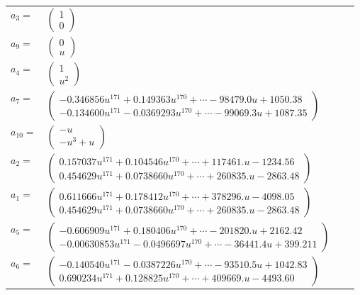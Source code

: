 \documentclass[1p]{elsarticle_modified}
\theoremstyle{definition}
\begin{document}
\begin{tabular}{m{7pt} m{180pt} m{7pt} m{180pt} }
\flushright $a_{3}=$&$\begin{pmatrix}1\\0\end{pmatrix}$ \\
\flushright $a_{9}=$&$\begin{pmatrix}0\\u\end{pmatrix}$ \\
\flushright $a_{4}=$&$\begin{pmatrix}1\\u^2\end{pmatrix}$ \\
\flushright $a_{7}=$&$\begin{pmatrix}-0.346856 u^{171}+0.149363 u^{170}+\cdots-98479.0 u+1050.38\\-0.134600 u^{171}-0.0369293 u^{170}+\cdots-99069.3 u+1087.35\end{pmatrix}$ \\
\flushright $a_{10}=$&$\begin{pmatrix}- u\\- u^3+u\end{pmatrix}$ \\
\flushright $a_{2}=$&$\begin{pmatrix}0.157037 u^{171}+0.104546 u^{170}+\cdots+117461. u-1234.56\\0.454629 u^{171}+0.0738660 u^{170}+\cdots+260835. u-2863.48\end{pmatrix}$ \\
\flushright $a_{1}=$&$\begin{pmatrix}0.611666 u^{171}+0.178412 u^{170}+\cdots+378296. u-4098.05\\0.454629 u^{171}+0.0738660 u^{170}+\cdots+260835. u-2863.48\end{pmatrix}$ \\
\flushright $a_{5}=$&$\begin{pmatrix}-0.606909 u^{171}+0.180406 u^{170}+\cdots-201820. u+2162.42\\-0.00630853 u^{171}-0.0496697 u^{170}+\cdots-36441.4 u+399.211\end{pmatrix}$ \\
\flushright $a_{6}=$&$\begin{pmatrix}-0.140540 u^{171}-0.0387226 u^{170}+\cdots-93510.5 u+1042.83\\0.690234 u^{171}+0.128825 u^{170}+\cdots+409669. u-4493.60\end{pmatrix}$ \\

\end{tabular}
\end{document}
